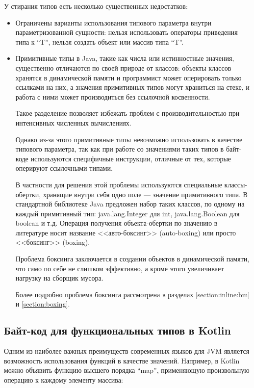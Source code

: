 У стирания типов есть несколько существенных недостатков:
\begin{itemize}
    \item Ограничены варианты использования типового параметра внутри параметризованной сущности:
    нельзя использовать операторы приведения типа к ``T'', нельзя создать объект или массив
    типа ``T''.
    \item Примитивные типы в Java, такие как числа или истинностные значения, существенно отличаются
    по своей природе от классов: объекты классов хранятся в динамической памяти и программист
    может оперировать только ссылками на них, а значения примитивных типов могут храниться на стеке,
    и работа с ними может производиться без ссылочной косвенности.

    Такое разделение позволяет избежать проблем с производительностью при интенсивных численных
    вычислениях.

    Однако из-за этого примитивные типы невозможно использовать в качестве типового параметра,
    так как при работе со значениями таких типов в байт-коде используются специфичные инструкции,
    отличные от тех, которые оперируют ссылочными типами.

    В частности для решения этой проблемы используются специальные классы-обертки, хранящие внутри
    себя одно поле --- значение примитивного типа. В стандартной библиотеке Java предложен набор
    таких классов, по одному на каждый примитивный тип: java.lang.Integer для int,
    java.lang.Boolean для boolean и т.д. Операция получения объекта-обертки по значению
    в литературе носит название <<авто-боксинг>> (auto-boxing) или просто <<боксинг>> (boxing).

    Проблема боксинга заключается в создании объектов в динамической памяти, что само по себе
    не слишком эффективно, а кроме этого увеличивает нагрузку на сборщик мусора.

    Более подробно проблема боксинга рассмотрена в разделах \ref{section:inline:bm} и \ref{section:boxing}.
\end{itemize}

\subsection{Байт-код для функциональных типов в Kotlin}
\label{section:lambda}
Одним из наиболее важных преимуществ современных языков для JVM является возможность использования
функций в качестве значений.
Например, в Kotlin можно объявить функцию высшего порядка ``map'', применяющую произвольную операцию
к каждому элементу массива:

